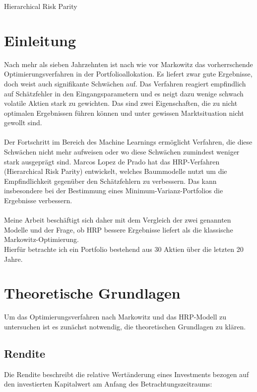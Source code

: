 \documentclass[parskip=half]{scrartcl}
\begin{document}
	\clearpage
	
	\setcounter{page}{1}
	
	Hierarchical Risk Parity
	\section{Einleitung}
	Nach mehr als sieben Jahrzehnten ist nach wie vor Markowitz das vorherrschende Optimierungsverfahren in der Portfolioallokation. Es liefert zwar gute Ergebnisse, doch weist auch signifikante Schwächen auf. Das Verfahren reagiert empfindlich auf Schätzfehler in den Eingangsparametern und es neigt dazu wenige schwach volatile Aktien stark zu gewichten. Das sind zwei Eigenschaften, die zu nicht optimalen Ergebnissen führen können und unter gewissen Marktsituation nicht gewollt sind. \\ \\
	Der Fortschritt im Bereich des Machine Learnings ermöglicht Verfahren, die diese Schwächen nicht mehr aufweisen oder wo diese Schwächen zumindest weniger stark ausgeprägt sind. Marcos Lopez de Prado hat das HRP-Verfahren (Hierarchical Risk Parity) entwickelt, welches Baummodelle nutzt um die Empfindlichkeit gegenüber den Schätzfehlern zu verbessern. Das kann insbesondere bei der Bestimmung eines Minimum-Varianz-Portfolios die Ergebnisse verbessern. \\ \\
	Meine Arbeit beschäftigt sich daher mit dem Vergleich der zwei genannten Modelle und der Frage, ob HRP bessere Ergebnisse liefert als die klassische Markowitz-Optimierung. \\
	Hierfür betrachte ich ein Portfolio bestehend aus 30 Aktien über die letzten 20 Jahre. \\
	
	
	\clearpage
	\section{Theoretische Grundlagen}
	Um das Optimierungsverfahren nach Markowitz und das HRP-Modell zu untersuchen ist es zunächst notwendig, die theoretischen Grundlagen zu klären.
	\subsection{Rendite}
	Die Rendite beschreibt die relative Wertänderung eines Investments bezogen auf den investierten Kapitalwert am Anfang des Betrachtungszeitraums:
	
\end{document}

